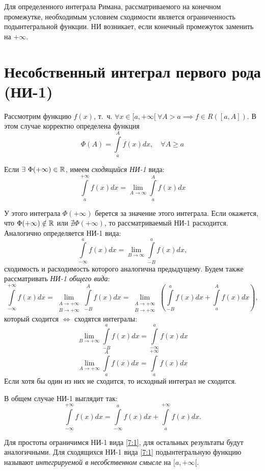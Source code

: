 \documentclass[../../main.tex]{subfiles}
\begin{document}
Для определенного интеграла Римана, рассматриваемого на конечном промежутке,
необходимым условием сходимости является ограниченность подынтегральной 
функции.
НИ возникает, если конечный промежуток заменить на $+\infty$.

\section{Несобственный интеграл первого рода (НИ-1)}

Рассмотрим функцию $f(x)$, т.~ч.
$\forall x \in [a, +\infty[ \ \forall A > a \implies f \in R([a, A])$.
В этом случае корректно определена функция
\begin{equation}
    \label{7:1}
    \Phi(A) = \displaystyle\int\limits_a^A f(x)dx,\quad\forall A \geq a
\end{equation}

Если $\exists \ \Phi(+\infty) \in \mathbb{R}$, имеем \emph{сходящийся НИ-1} вида:
\begin{equation}
    \label{7:2}
    \int\limits_a^{+\infty} f(x)dx =
    \lim\limits_{A \to \infty} \int\limits_a^A f(x)dx
\end{equation}

У этого интеграла $\Phi(+\infty)$ берется за значение этого интеграла. Если 
окажется,
что ${\Phi(+\infty) \notin \mathbb{R}}$ или $ \nexists \Phi(+\infty)$, то 
рассматриваемый НИ-1 расходится.
Аналогично определяется НИ-1 вида:
\[\int\limits_{-\infty}^a f(x)dx =
\lim\limits_{B \to \infty} \int\limits_{-B}^a f(x)dx, \]
сходимость и расходимость которого аналогична предыдущему.
Будем также рассматривать \emph{НИ-1 общего вида}:
\[ \int\limits_{-\infty}^{+\infty} f(x)dx =
\lim\limits_{\substack{A \to +\infty \\ B \to +\infty}}
\int\limits_{-B}^A f(x)dx =
\lim\limits_{\substack{A \to +\infty \\ B \to +\infty}}
\left( \int\limits_{-B}^a f(x)dx + \int\limits_a^{A} f(x)dx \right), \]
который сходится $\iff$ сходятся интегралы:
\[ \lim\limits_{B \to +\infty} \int\limits_{-B}^a f(x)dx
= \int\limits_{-\infty}^a f(x)dx \]
\[\lim\limits_{A \to +\infty} \int\limits_a^{A} f(x)dx
= \int\limits_a^{+\infty} f(x)dx \]
Если хотя бы один из них не сходится, то исходный интеграл не сходится.

В общем случае НИ-1 выглядит так:
\[ \int\limits_{-\infty}^{+\infty} f(x)dx  = \int\limits_{-\infty}^a f(x)dx
+ \int\limits_a^{+\infty} f(x)dx.\]

Для простоты ограничимся НИ-1 вида \eqref{7:1}, для остальных результаты будут
аналогичными. Для сходящихся НИ-1 вида \eqref{7:1} подынтегральную функцию 
называют \emph{интегрируемой в несобственном смысле} на $[a, +\infty[$.
\end{document}
